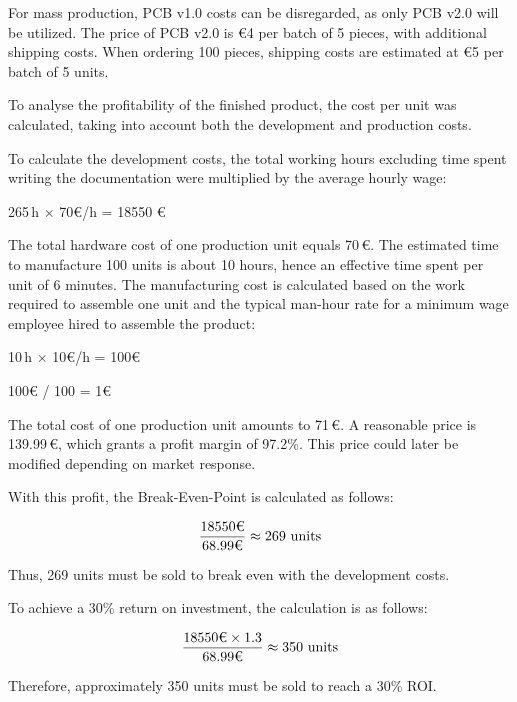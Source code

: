 \newpage

For mass production, PCB v1.0 costs can be disregarded, as only PCB v2.0 will be utilized. The price of PCB v2.0 is €4 per batch of 5 pieces, with additional shipping costs. When ordering 100 pieces, shipping costs are estimated at €5 per batch of 5 units.

To analyse the profitability of the finished product, the cost per unit was calculated, taking into account both the development and production costs.

To calculate the development costs, the total working hours excluding time spent writing the documentation were multiplied by the average hourly wage:

\vspace{0.5cm}
\begin{center}
265\,h $\times$ 70\textup{€}/h = 18550 \textup{€}
\end{center}
\vspace{0.5cm}
 
The total hardware cost of one production unit equals 70\,€.  
The estimated time to manufacture 100 units is about 10 hours, hence an effective time spent per unit of 6 minutes.
The manufacturing cost is calculated based on the work required to assemble one unit and the typical man-hour rate for a minimum wage employee hired to assemble the product:

\vspace{0.5cm}
\begin{center}
10\,h $\times$ 10\textup{€}/h = 100\textup{€}
\end{center}

\begin{center}
100\textup{€} / 100 = 1\textup{€}
\end{center}
\vspace{0.5cm}

The total cost of one production unit amounts to 71\,€. 
A reasonable price is 139.99\,€, 
which grants a profit margin of 97.2\%.
This price could later be modified depending on market response.

With this profit, the Break-Even-Point is calculated as follows:

\vspace{0.5cm}
\begin{center}
\[
\frac{18550\textup{€}}{68.99\textup{€}} \approx 269 \textup{ units}
\]
\end{center}
\vspace{0.5cm}

Thus, 269 units must be sold to break even with the development costs.

To achieve a 30\% return on investment, the calculation is as follows:

\vspace{0.5cm}
\begin{center}
\[
\frac{18550\textup{€} \times 1.3}{68.99\textup{€}} \approx 350 \textup{ units}
\]
\end{center}
\vspace{0.5cm}

Therefore, approximately 350 units must be sold to reach a 30\% ROI.
